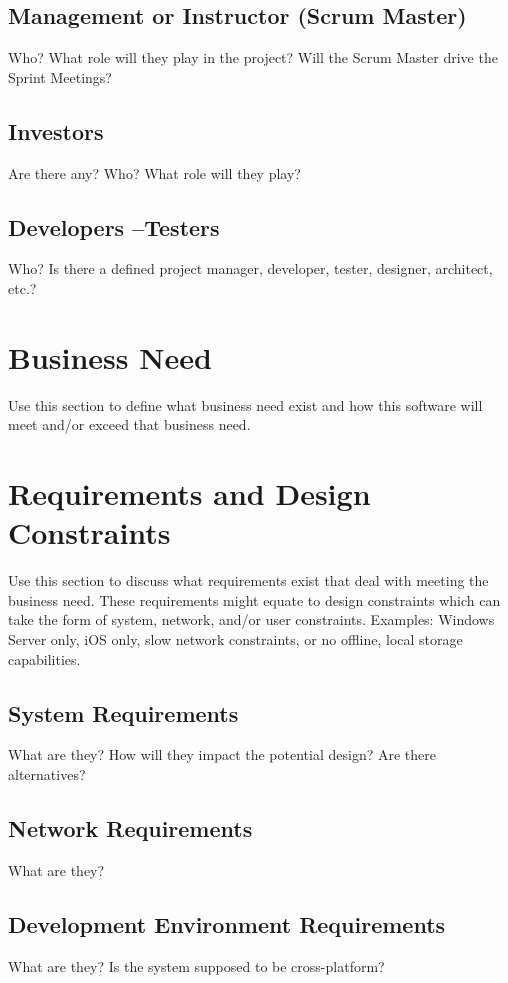 \subsection{Management or Instructor (Scrum Master)}
Who?  What role will they play in the project?  Will the Scrum Master drive the 
Sprint Meetings? 


\subsection{Investors}
Are there any?  Who?  What role will they play? 


\subsection{Developers --Testers}
Who?  Is there a defined project manager, developer, tester, designer, architect, 
etc.? 


\section{Business Need}
Use this section to define what business need exist and how this software will 
meet and/or exceed that business need.   

\section{Requirements and Design Constraints}
Use this section to discuss what requirements exist that deal with meeting the 
business need.  These requirements might equate to design constraints which can 
take the form of system, network, and/or user constraints.  Examples:  Windows 
Server only, iOS only, slow network constraints, or no offline, local storage capabilities. 


\subsection{System  Requirements}
What are they?  How will they impact the potential design?  Are there alternatives? 


\subsection{Network Requirements}
What are they? 


\subsection{Development Environment Requirements}
What are they?  Is the system supposed to be cross-platform? 


